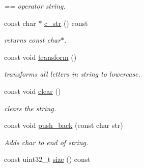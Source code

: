 \begin{DoxyCompactItemize}
\begin{DoxyCompactList}\small\item\em == operator string. \end{DoxyCompactList}\item 
const char $\ast$ \hyperlink{class_ensum_1_1string_a2d667ea4adbf4f9cd08011972176aacb}{c\+\_\+str} () const \hypertarget{class_ensum_1_1string_a2d667ea4adbf4f9cd08011972176aacb}{}\label{class_ensum_1_1string_a2d667ea4adbf4f9cd08011972176aacb}

\begin{DoxyCompactList}\small\item\em returns const char$\ast$. \end{DoxyCompactList}\item 
const void \hyperlink{class_ensum_1_1string_ad183e0697bed62d8e5639d17a5288a15}{transform} ()\hypertarget{class_ensum_1_1string_ad183e0697bed62d8e5639d17a5288a15}{}\label{class_ensum_1_1string_ad183e0697bed62d8e5639d17a5288a15}

\begin{DoxyCompactList}\small\item\em transforms all letters in string to lowercase. \end{DoxyCompactList}\item 
const void \hyperlink{class_ensum_1_1string_a27c098c250b2df7ed3fa935e0d318fe2}{clear} ()\hypertarget{class_ensum_1_1string_a27c098c250b2df7ed3fa935e0d318fe2}{}\label{class_ensum_1_1string_a27c098c250b2df7ed3fa935e0d318fe2}

\begin{DoxyCompactList}\small\item\em clears the string. \end{DoxyCompactList}\item 
const void \hyperlink{class_ensum_1_1string_af373cc0f29c09f8df78e3b96d279b609}{push\+\_\+back} (const char str)\hypertarget{class_ensum_1_1string_af373cc0f29c09f8df78e3b96d279b609}{}\label{class_ensum_1_1string_af373cc0f29c09f8df78e3b96d279b609}

\begin{DoxyCompactList}\small\item\em Adds char to end of string. \end{DoxyCompactList}\item 
const uint32\+\_\+t \hyperlink{class_ensum_1_1string_ac3c5ca17258824b74dc8da3d5b7602cd}{size} () const \hypertarget{class_ensum_1_1string_ac3c5ca17258824b74dc8da3d5b7602cd}{}\label{class_ensum_1_1string_ac3c5ca17258824b74dc8da3d5b7602cd}


\end{DoxyCompactItemize}
